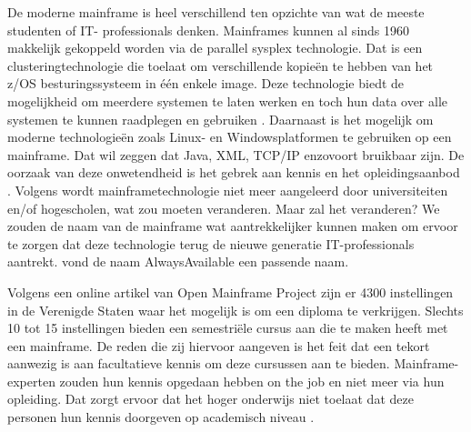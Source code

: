 De moderne mainframe is heel verschillend ten opzichte van wat de meeste studenten of IT- professionals denken. Mainframes kunnen al sinds 1960 makkelijk gekoppeld worden via de parallel sysplex technologie. Dat is een clusteringtechnologie die toelaat om verschillende kopieën te hebben van het z/OS besturingssysteem in één enkele image. Deze technologie biedt de mogelijkheid om meerdere systemen te laten werken en toch hun data over alle systemen te kunnen raadplegen en gebruiken \autocite{Sarkar2020}. Daarnaast is het mogelijk om moderne technologieën zoals Linux- en Windowsplatformen te gebruiken op een mainframe. Dat wil zeggen dat Java, XML, TCP/IP enzovoort bruikbaar zijn. De oorzaak van deze onwetendheid is het gebrek aan kennis en het opleidingsaanbod \autocite{Mullins2016}. Volgens \textcite{Mullins2016} wordt mainframetechnologie niet meer aangeleerd door universiteiten en/of hogescholen, wat zou moeten veranderen. Maar zal het veranderen? We zouden de naam van de mainframe wat aantrekkelijker kunnen maken om ervoor te zorgen dat deze technologie terug de nieuwe generatie IT-professionals aantrekt. \textcite{Mullins2016} vond de naam AlwaysAvailable een passende naam.


Volgens een online artikel van Open Mainframe Project \autocite{2020} zijn er 4300 instellingen in de Verenigde Staten waar het mogelijk is om een diploma te verkrijgen. Slechts 10 tot 15 instellingen bieden een semestriële cursus aan die te maken heeft met een mainframe. De reden die zij hiervoor aangeven is het feit dat een tekort aanwezig is aan facultatieve kennis om deze cursussen aan te bieden. Mainframe-experten zouden hun kennis opgedaan hebben on the job en niet meer via hun opleiding. Dat zorgt ervoor dat het hoger onderwijs niet toelaat dat deze personen hun kennis doorgeven op academisch niveau \autocite{2020}. 

\section{}
\label{sec:De laatste nieuwe mainframe technologie}

